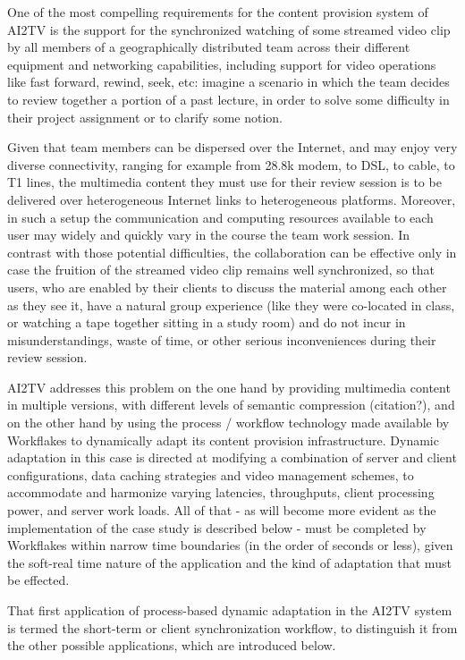\documentclass[12pt]{article}
\begin{document}
One of the most compelling requirements for the content provision
system of AI2TV is the support for the synchronized watching of some
streamed video clip by all members of a geographically distributed
team across their different equipment and networking capabilities,
including support for video operations like fast forward, rewind,
seek, etc: imagine a scenario in which the team decides to review
together a portion of a past lecture, in order to solve some
difficulty in their project assignment or to clarify some notion.

Given that team members can be dispersed over the Internet, and may
enjoy very diverse connectivity, ranging for example from 28.8k modem,
to DSL, to cable, to T1 lines, the multimedia content they must use
for their review session is to be delivered over heterogeneous
Internet links to heterogeneous platforms. Moreover, in such a setup
the communication and computing resources available to each user may
widely and quickly vary in the course the team work session. In
contrast with those potential difficulties, the collaboration can be
effective only in case the fruition of the streamed video clip remains
well synchronized, so that users, who are enabled by their clients to
discuss the material among each other as they see it, have a natural
group experience (like they were co-located in class, or watching a
tape together sitting in a study room) and do not incur in
misunderstandings, waste of time, or other serious inconveniences
during their review session.

AI2TV addresses this problem on the one hand by providing multimedia
content in multiple versions, with different levels of semantic
compression (citation?), and on the other hand by using the process /
workflow technology made available by Workflakes to dynamically adapt
its content provision infrastructure. Dynamic adaptation in this case
is directed at modifying a combination of server and client
configurations, data caching strategies and video management schemes,
to accommodate and harmonize varying latencies, throughputs, client
processing power, and server work loads. All of that - as will become
more evident as the implementation of the case study is described
below - must be completed by Workflakes within narrow time boundaries
(in the order of seconds or less), given the soft-real time nature of
the application and the kind of adaptation that must be effected.

That first application of process-based dynamic adaptation in the
AI2TV system is termed the short-term or client synchronization
workflow, to distinguish it from the other possible applications,
which are introduced below.
\end{document}
